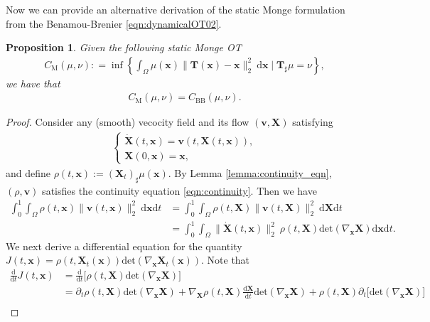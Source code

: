\documentclass[11pt]{book}
\newtheorem{proposition}[theorem]{Proposition}
\newcommand{\dx}{\mathrm{d}\mathbf{x}}
\newcommand{\dt}{\mathrm{d}t}
\begin{document}
Now we can provide an alternative derivation of the static Monge formulation from the Benamou-Brenier \eqref{eqn:dynamicalOT02}.
\begin{proposition}
    Given the following static Monge OT
    \begin{align}
        C_{\mathrm{M}}(\mu,\nu) : = \inf \left\{\int_{\Omega}  \mu(\mathbf{x}) \|\mathbf{T}(\mathbf{x}) - \mathbf{x}\|_2^2  \ \dx \mid \mathbf{T}_\sharp \mu = \nu \right\}, 
    \end{align}
    we have that
    \begin{align*}
        C_{\mathrm{M}}(\mu,\nu) = C_{\mathrm{BB}}(\mu,\nu).
    \end{align*}
\end{proposition}
\begin{proof}
    Consider any (smooth) vecocity field and its flow $(\mathbf{v}, \mathbf{X})$ satisfying
    \begin{align}\label{eqn:dynamicalOT_velocity_flow02}
        \begin{cases}
            \dot{\mathbf{X}}(t, \mathbf{x}) = \mathbf{v}(t, \mathbf{X}(t, \mathbf{x})), \\
            \mathbf{X}(0, \mathbf{x}) = \mathbf{x},
        \end{cases}
    \end{align}
    and define $\rho(t,\mathbf{x}) := (\mathbf{X}_t)_{\sharp}\mu(\mathbf{x})$. By Lemma \ref{lemma:continuity_eqn}, $(\rho,\mathbf{v})$ satisfies the continuity equation \eqref{eqn:continuity}. Then we have
    \begin{align}
        \int_0^1 \int_{\Omega} \rho(t,\mathbf{x}) \|\mathbf{v}(t,\mathbf{x})\|_2^2 \ \dx\dt
        &= \int_0^1 \int_{\Omega} \rho(t,\mathbf{X}) \|\mathbf{v}(t,\mathbf{X})\|_2^2 \ \mathrm{d}\mathbf{X}\dt \nonumber\\
        &= \int_0^1 \int_{\Omega}  \|\dot{\mathbf{X}}(t,\mathbf{x})\|_2^2 \ \rho(t,\mathbf{X}) \mathrm{det}(\nabla_{\mathbf{x}}\mathbf{X}) \mathrm{d}\mathbf{x}\dt. \label{eqn:CM_CBB_temp}
    \end{align}
    We next derive a differential equation for the quantity $J(t,\mathbf{x}) = \rho(t,\mathbf{X}_t(\mathbf{x})) \mathrm{det}(\nabla_{\mathbf{x}}\mathbf{X}_t(\mathbf{x}))$. Note that
    \begin{align*}
        \frac{\mathrm{d}}{\mathrm{d}t}J(t,\mathbf{x}) 
       & = \frac{\mathrm{d}}{\mathrm{d}t} \Big[ \rho(t,\mathbf{X}) \mathrm{det}(\nabla_{\mathbf{x}}\mathbf{X}) \Big] \\
       & = \partial_t\rho(t,\mathbf{X}) \mathrm{det}(\nabla_{\mathbf{x}}\mathbf{X}) + \nabla_{\mathbf{X}} \rho(t,\mathbf{X}) \frac{\mathrm{d}\mathbf{X}}{\mathrm{d}t} \mathrm{det}(\nabla_{\mathbf{x}}\mathbf{X}) + \rho(t,\mathbf{X}) \partial_t\Big[ \mathrm{det}(\nabla_{\mathbf{x}}\mathbf{X}) \Big] \\

\end{align*}
\end{proof}
\end{document}
